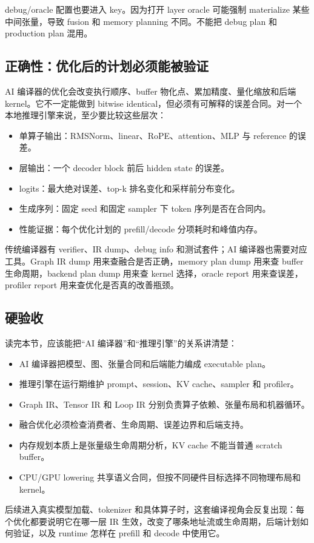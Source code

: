 debug/oracle 配置也要进入 key。因为打开 layer oracle 可能强制 materialize 某些中间张量，导致 fusion 和 memory planning 不同。不能把 debug plan 和 production plan 混用。

\subsection{正确性：优化后的计划必须能被验证}

AI 编译器的优化会改变执行顺序、buffer 物化点、累加精度、量化缩放和后端 kernel。它不一定能做到 bitwise identical，但必须有可解释的误差合同。对一个本地推理引擎来说，至少要比较这些层次：

\begin{itemize}
  \item 单算子输出：RMSNorm、linear、RoPE、attention、MLP 与 reference 的误差。
  \item 层输出：一个 decoder block 前后 hidden state 的误差。
  \item logits：最大绝对误差、top-k 排名变化和采样前分布变化。
  \item 生成序列：固定 seed 和固定 sampler 下 token 序列是否在合同内。
  \item 性能证据：每个优化计划的 prefill/decode 分项耗时和峰值内存。
\end{itemize}

传统编译器有 verifier、IR dump、debug info 和测试套件；AI 编译器也需要对应工具。Graph IR dump 用来查融合是否正确，memory plan dump 用来查 buffer 生命周期，backend plan dump 用来查 kernel 选择，oracle report 用来查误差，profiler report 用来查优化是否真的改善瓶颈。

\subsection{硬验收}

读完本节，应该能把“AI 编译器”和“推理引擎”的关系讲清楚：

\begin{itemize}
  \item AI 编译器把模型、图、张量合同和后端能力编成 executable plan。
  \item 推理引擎在运行期维护 prompt、session、KV cache、sampler 和 profiler。
  \item Graph IR、Tensor IR 和 Loop IR 分别负责算子依赖、张量布局和机器循环。
  \item 融合优化必须检查消费者、生命周期、误差边界和后端支持。
  \item 内存规划本质上是张量级生命周期分析，KV cache 不能当普通 scratch buffer。
  \item CPU/GPU lowering 共享语义合同，但按不同硬件目标选择不同物理布局和 kernel。
\end{itemize}

后续进入真实模型加载、tokenizer 和具体算子时，这套编译视角会反复出现：每个优化都要说明它在哪一层 IR 生效，改变了哪条地址流或生命周期，后端计划如何验证，以及 runtime 怎样在 prefill 和 decode 中使用它。
